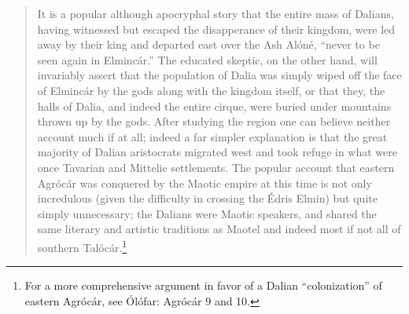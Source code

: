 \documentclass{article}
\begin{document}
\begin{quotation}


It is a popular although apocryphal story that the entire mass of Dalians, having witnessed but escaped the disapperance of their kingdom, were led away by their king and departed east over the Ash Alóné, ``never to be seen again in Elmincár.'' The educated skeptic, on the other hand, will invariably assert that the population of Dalia was simply wiped off the face of Elmincár by the gods along with the kingdom itself, or that they, the halls of Dalia, and indeed the entire cirque, were buried under mountains thrown up by the gods. After studying the region one can believe neither account much if at all; indeed a far simpler explanation is that the great majority of Dalian aristocrats migrated west and took refuge in what were once Tavarian and Mittelic settlements. The popular account that eastern Agrócár was conquered by the Maotic empire at this time is not only incredulous (given the difficulty in crossing the Édris Elmin) but quite simply unnecessary; the Dalians were Maotic speakers, and shared the same literary and artistic traditions as Maotel and indeed most if not all of southern Talócár.\footnote{For a more comprehensive argument in favor of a Dalian ``colonization'' of eastern Agrócár, see Ólófar: Agrócár 9 and 10.}


\end{quotation}
\end{document}
